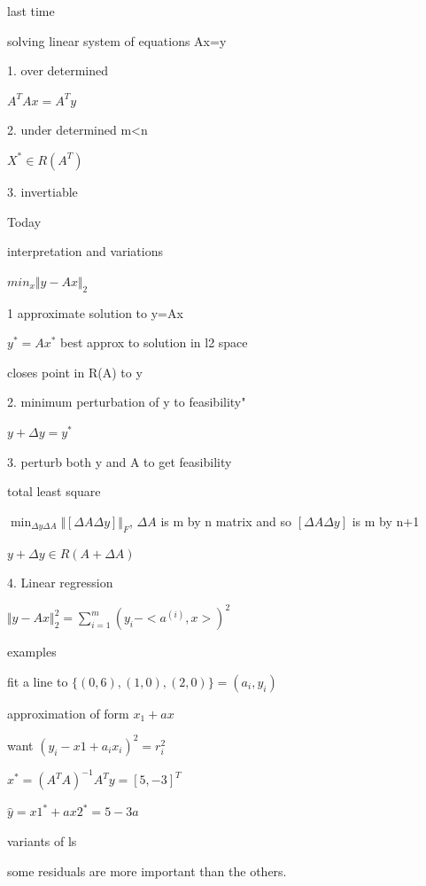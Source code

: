 


last time

solving linear system of equations Ax=y

1. over determined

$A^TAx=A^Ty$


2. under determined m<n

$X^* \in R(A^T)  $ 

3. invertiable




Today

interpretation and variations 


$min_x \Vert y-Ax\Vert_2$

1 approximate solution to y=Ax

$y^*=Ax^*$ best approx to solution in l2 space

closes point in R(A) to y

2. minimum perturbation of y to feasibility"

$y+\Delta y= y^*$

3. perturb both y and A to get feasibility

total least square

$\min_{\Delta y \Delta A} \Vert [\Delta A \Delta y] \Vert_F$, $\Delta A$ is m by n matrix and so $[\Delta A \Delta y]$ is m by n+1



$y+\Delta y\in R(A+\Delta A)$


4. Linear regression

$\Vert y-Ax\Vert ^2_2 = \sum_{i=1}^{m} ( y_i - <a^{(i)} , x>)^2$


examples

fit a line to $\{(0,6),(1,0),(2,0) \}={(a_i,y_i)}$

approximation of form $x_1+ax$

want $(y_i-x1+a_ix_i)^2 = r_i^2$

$x^*=(A^TA)^{-1}A^Ty=[5 , -3]^T$


$\hat{y}=x1^*+ax2^*=5-3a$            %


variants of ls

some residuals are more important than the others.

